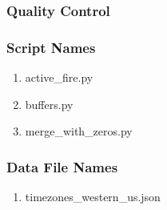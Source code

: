 \subsubsection*{Quality Control}
\subsubsection*{Script Names}
\begin{enumerate}
\item active\_fire.py
\item buffers.py
\item merge\_with\_zeros.py
\end{enumerate}
\subsubsection*{Data File Names}
\begin{enumerate}
\item timezones\_western\_us.json
\end{enumerate}

